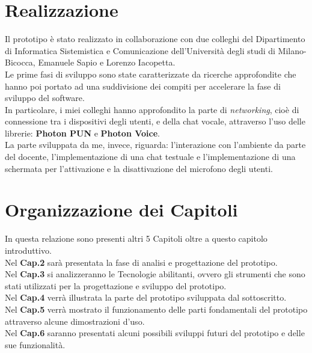\section{Realizzazione}
Il prototipo è stato realizzato in collaborazione con due colleghi del Dipartimento di Informatica Sistemistica e Comunicazione dell'Università degli studi di Milano-Bicocca, Emanuele Sapio e Lorenzo Iacopetta.
\\Le prime fasi di sviluppo sono state caratterizzate da ricerche approfondite che hanno poi portato ad una suddivisione dei compiti per accelerare la fase di sviluppo del software.
\\In particolare, i miei colleghi hanno approfondito la parte di \textit{\gls{networking}}, cioè di connessione tra i dispositivi degli utenti, e della chat vocale, attraverso l'uso delle librerie: \textbf{Photon PUN} e \textbf{Photon Voice}.
\\La parte sviluppata da me, invece, riguarda: l'interazione con l'ambiente da parte del docente, l'implementazione di una chat testuale e l'implementazione di una schermata per l'attivazione e la disattivazione del microfono degli utenti.
\section{Organizzazione dei Capitoli}
In questa relazione sono presenti altri 5 Capitoli oltre a questo capitolo introduttivo.
\\Nel \textbf{Cap.2} sarà presentata la fase di analisi e progettazione del prototipo.
\\Nel \textbf{Cap.3} si analizzeranno le Tecnologie abilitanti, ovvero gli strumenti che sono stati utilizzati per la progettazione e sviluppo del prototipo.
\\Nel \textbf{Cap.4} verrà illustrata la parte del prototipo sviluppata dal sottoscritto.
\\Nel \textbf{Cap.5} verrà mostrato il funzionamento delle parti fondamentali del prototipo attraverso alcune dimostrazioni d'uso.
\\Nel \textbf{Cap.6} saranno presentati alcuni possibili sviluppi futuri del prototipo e delle sue funzionalità. 
